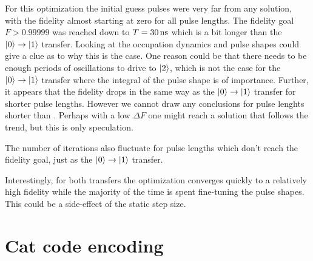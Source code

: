 \documentclass[main.tex]{subfiles}
\begin{document}
For this optimization the initial guess pulses were very far from any solution, with the fidelity almost starting at zero for all pulse lengths.
The fidelity goal \(F > 0.99999\) was reached down to \(T = \SI{30}{\nano\second}\) which is a bit longer than the \(\ket{0}\rightarrow\ket{1}\) transfer.
Looking at the occupation dynamics and pulse shapes could give a clue as to why this is the case.
One reason could be that there needs to be enough periods of oscillations to drive to \(\ket{2}\), which is not the case for the \(\ket{0}\rightarrow\ket{1}\) transfer where the integral of the pulse shape is of importance.
Further, it appears that the fidelity drops in the same way as the \(\ket{0}\rightarrow\ket{1}\) transfer for shorter pulse lengths.
However we cannot draw any conclusions for pulse lenghts shorter than .
Perhaps with a low \(\Delta F\) one might reach a solution that follows the trend, but this is only speculation.

The number of iterations also fluctuate for pulse lengths which don't reach the fidelity goal, just as the \(\ket{0}\rightarrow\ket{1}\) transfer.

Interestingly, for both transfers the optimization converges quickly to a relatively high fidelity while the majority of the time is spent fine-tuning the pulse shapes.
This could be a side-effect of the static step size.


\section{Cat code encoding}

\end{document}
